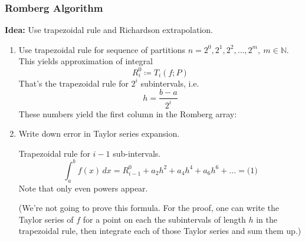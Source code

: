 \subsubsection{Romberg Algorithm}
\textbf{Idea:} Use trapezoidal rule and Richardson extrapolation.
\begin{enumerate}
    \item {
        Use trapezoidal rule for sequence of partitions
        $n = 2^0, 2^1, 2^2, \dots, 2^m,\ m \in \mathbb{N}$.
        This yields approximation of integral
        \[ R_i^0 \coloneqq T_i(f; P) \]
        That's the trapezoidal rule for $2^i$ subintervals, i.e.
        \[ h = \frac{b - a}{2^i} \]
        These numbers yield the first column in the Romberg array:
        \begin{center}
        \end{center}
    }
    \item {
        Write down error in Taylor series expansion.

        Trapezoidal rule for $i - 1$ sub-intervals.
        \[
            \int_a^b f(x) \,dx = R_{i-1}^0 + a_2 h^2 + a_4 h^4 + a_6 h^6 + \ldots = \text{(1)}
        \]
        Note that only even powers appear.

        (We're not going to prove this formula. For the proof, one
        can write the Taylor series of $f$ for a point on each the subintervals of length $h$ in the trapezoidal rule,
        then integrate each of those Taylor series and sum them up.)

}
\end{enumerate}
